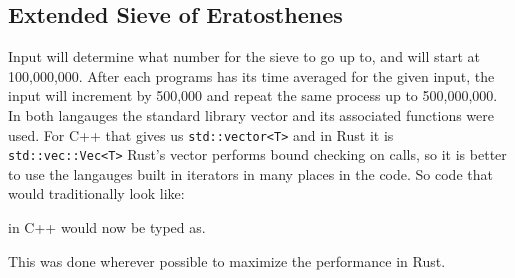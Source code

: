 \documentclass[10pt]{IEEEtran}
\begin{document}
\subsection{Extended Sieve of Eratosthenes}
Input will determine what number for the sieve to go up to, and will start at 100,000,000.
After each programs has its time averaged for the given input, the input will increment by 500,000 and repeat the same process up to 500,000,000.
% 
% 
% 
% 
% 
%         
% 
% 
%             
%         
% 
In both langauges the standard library vector and its associated functions were used.
For C++ that gives us \verb|std::vector<T>| and in Rust it is \verb|std::vec::Vec<T>| 
Rust's vector performs bound checking on calls, so 
it is better to use the langauges built in iterators in many places in 
the code. So code that would traditionally look like:

in C++ would now be typed as.

This was done wherever possible to maximize the performance in Rust.
\end{document}
